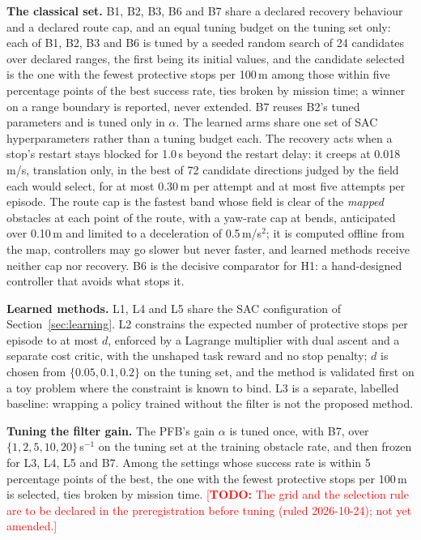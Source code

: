 \documentclass[sensors,article,submit,moreauthors]{Definitions/mdpi}
\newcommand{\todo}[1]{\textcolor{red}{[\textbf{TODO:} #1]}}
\begin{document}
\textbf{The classical set.} B1, B2, B3, B6 and B7 share a declared recovery behaviour and a declared route cap, and an equal tuning budget on the tuning set only: each of B1, B2, B3 and B6 is tuned by a seeded random search of 24 candidates over declared ranges, the first being its initial values, and the candidate selected is the one with the fewest protective stops per 100\,m among those within five percentage points of the best success rate, ties broken by mission time; a winner on a range boundary is reported, never extended. B7 reuses B2's tuned parameters and is tuned only in $\alpha$. The learned arms share one set of SAC hyperparameters rather than a tuning budget each. The recovery acts when a stop's restart stays blocked for 1.0\,s beyond the restart delay: it creeps at 0.018\,m/s, translation only, in the best of 72 candidate directions judged by the field each would select, for at most 0.30\,m per attempt and at most five attempts per episode. The route cap is the fastest band whose field is clear of the \emph{mapped} obstacles at each point of the route, with a yaw-rate cap at bends, anticipated over 0.10\,m and limited to a deceleration of 0.5\,m/s$^2$; it is computed offline from the map, controllers may go slower but never faster, and learned methods receive neither cap nor recovery. B6 is the decisive comparator for H1: a hand-designed controller that avoids what stops it.

\textbf{Learned methods.} L1, L4 and L5 share the SAC configuration of Section~\ref{sec:learning}. L2 constrains the expected number of protective stops per episode to at most $d$, enforced by a Lagrange multiplier with dual ascent and a separate cost critic, with the unshaped task reward and no stop penalty; $d$ is chosen from $\{0.05, 0.1, 0.2\}$ on the tuning set, and the method is validated first on a toy problem where the constraint is known to bind. L3 is a separate, labelled baseline: wrapping a policy trained without the filter is not the proposed method.

\textbf{Tuning the filter gain.} The PFB's gain $\alpha$ is tuned once, with B7, over $\{1, 2, 5, 10, 20\}$\,s$^{-1}$ on the tuning set at the training obstacle rate, and then frozen for L3, L4, L5 and B7. Among the settings whose success rate is within 5 percentage points of the best, the one with the fewest protective stops per 100\,m is selected, ties broken by mission time. \todo{The grid and the selection rule are to be declared in the preregistration before tuning (ruled 2026-10-24); not yet amended.}
\end{document}
